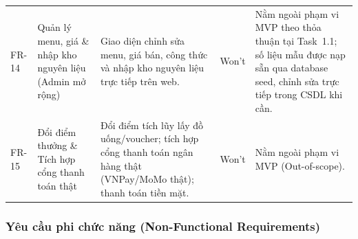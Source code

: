 \begin{longtable}{@{}p{1.2cm}p{2.6cm}p{4.2cm}p{1.4cm}p{6.6cm}@{}}
FR-14 & Quản lý menu, giá \& nhập kho nguyên liệu (Admin mở rộng)
  & Giao diện chỉnh sửa menu, giá bán, công thức và nhập kho nguyên liệu trực tiếp trên web.
  & Won't
  & Nằm ngoài phạm vi MVP theo thỏa thuận tại Task~1.1; số liệu mẫu được nạp sẵn qua database seed, chỉnh sửa trực tiếp trong CSDL khi cần. \\
\addlinespace

FR-15 & Đổi điểm thưởng \& Tích hợp cổng thanh toán thật
  & Đổi điểm tích lũy lấy đồ uống/voucher; tích hợp cổng thanh toán ngân hàng thật (VNPay/MoMo thật); thanh toán tiền mặt.
  & Won't
  & Nằm ngoài phạm vi MVP (Out-of-scope). \\
\bottomrule
\end{longtable}

\subsubsection{Yêu cầu phi chức năng (Non-Functional Requirements)}


